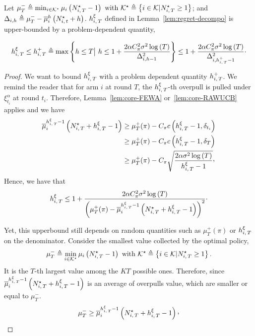 \begin{lemma}\label{lem:UB-OP-PD}
Let $\mu^-_T\triangleq \min_{i \in \mathcal{K}^\star} \mu_i \left(N_{i,\,T}^\star -1\right)\text{ with } \mathcal{K}^\star \triangleq\left\{ i \in \mathcal{K} | N_{i,\,T}^\star \geq 1 \right\}$; and $\Delta_{i,h} \triangleq \mu^-_T- \overline{\mu}_i^h\left( N_{i,\,t}^\star+h \right)$. $h_{i,\,T}^\xi$ defined in Lemma~\ref{lem:regret-decompo} is upper-bounded by a problem-dependent quantity,

\begin{equation*}
h_{i,\,T}^\xi \leq   h_{i,\,T}^+  \triangleq \max \left\{ h \leq T \big| \ h \leq  1 + \frac{2\alpha C_\pi^2 \sigma^2 \log \left(T\right)}{\Delta_{i,h-1}^2} \right\}  \leq  1 + \frac{2\alpha C_\pi^2 \sigma^2 \log \left(T\right)}{\Delta_{i,h_{i,\,T}^+-1}^2}\cdot
\end{equation*}
\end{lemma}
\begin{proof}

We want to bound $h_{i,\,T}^\xi $ with a problem dependent quantity $h_{i,\,T}^+$. We remind the reader that for arm $i$ at round $T$, the $h_{i,\,T}^\xi$-th overpull is pulled under $\xi^\alpha_{t_i}$ at round $t_i$. Therefore, Lemma~\ref{lem:core-FEWA} or~\ref{lem:core-RAWUCB} applies and we have
\begin{align*}
\bmu_i^{\hiT^\xi  - 1} \left( \NiT^\star + \hiT^\xi   - 1 \right) &\geq \mu_T^+(\pi) - C_\pi c\pa{\hiT^\xi   - 1, \delta_{t_i}}
\\& \geq \mu_T^+(\pi) - C_\pi c\pa{\hiT^\xi   - 1, \delta_T}
\\& \geq \mu_T^+(\pi) - C_\pi \sqrt{\frac{2\alpha\sigma^2\log\pa{T}}{\hiT^\xi-1}}\CommaBin
\end{align*}
Hence, we have that 
\begin{equation}
\label{eq:hiTxi-bound}
h_{i,\,T}^\xi \leq 1 + \frac{2\alpha C_\pi^2 \sigma^2\log\left(T\right)}{\left(\mu_T^+(\pi)- \overline{\mu}_i^{h_{i,\,T}^\xi  - 1} \left( N_{i,\,T}^\star + h_{i,\,T}^\xi   - 1 \right) \right)^2 }\cdot
\end{equation}

Yet, this upperbound still depends on random quantities such as $\mu_T^+(\pi)$ or $h_{i,\,T}^\xi$ on the denominator. 
Consider the smallest value collected by the optimal policy, 
\[
\mu^-_T\triangleq \min_{i \in \mathcal{K}^\star} \mu_i \left(N_{i,\,T}^\star -1\right)\text{ with } \mathcal{K}^\star \triangleq\left\{ i \in \mathcal{K} | N_{i,\,T}^\star \geq 1 \right\}.
\]
It is the $T$-th largest value among the $KT$ possible ones. Therefore, since $\overline{\mu}_i^{h_{i,\,T}^\xi  - 1} \left( N_{i,\,T}^\star + h_{i,\,T}^\xi  - 1 \right)$ is an average of overpulls value, which are smaller or equal to $\mu^-_T$.
\[\mu^-_T\geq \bmu_i^{\hiT^\xi  - 1} \left( \NiT^\star + \hiT^\xi   - 1 \right)\CommaBin\] 


\end{proof}
